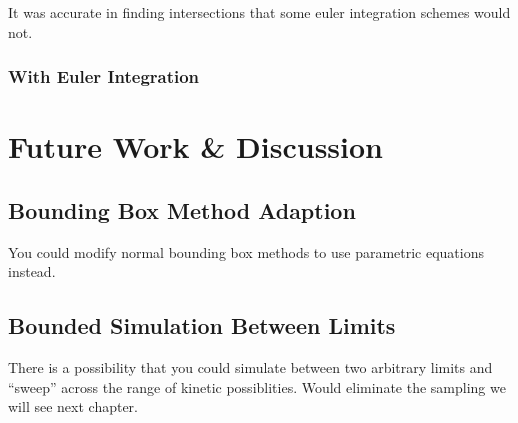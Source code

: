 	It was accurate in finding intersections that some euler integration schemes would not.

		\subsubsection{With Euler Integration}

\section{Future Work \& Discussion}

	\subsection{Bounding Box Method Adaption}

	You could modify normal bounding box methods to use parametric equations instead.

	\subsection{Bounded Simulation Between Limits}

	There is a possibility that you could simulate between two arbitrary limits and ``sweep'' across the range of kinetic possiblities. Would eliminate the sampling we will see next chapter.
